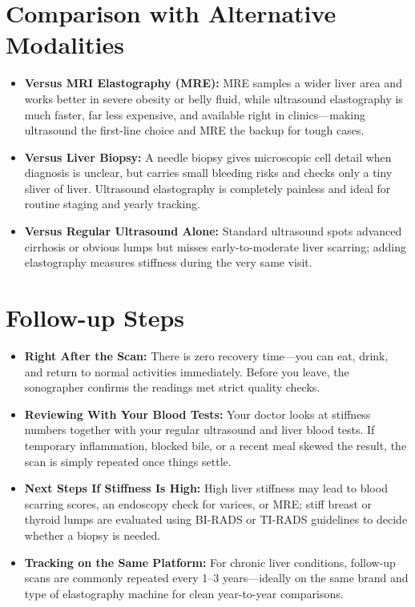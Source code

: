 \section{Comparison with Alternative Modalities}

\begin{itemize}
    \item \textbf{Versus MRI Elastography (MRE):} MRE samples a wider liver area and works better in severe obesity or belly fluid, while ultrasound elastography is much faster, far less expensive, and available right in clinics---making ultrasound the first-line choice and MRE the backup for tough cases.
    \item \textbf{Versus Liver Biopsy:} A needle biopsy gives microscopic cell detail when diagnosis is unclear, but carries small bleeding risks and checks only a tiny sliver of liver. Ultrasound elastography is completely painless and ideal for routine staging and yearly tracking.
    \item \textbf{Versus Regular Ultrasound Alone:} Standard ultrasound spots advanced cirrhosis or obvious lumps but misses early-to-moderate liver scarring; adding elastography measures stiffness during the very same visit.
\end{itemize}

\section{Follow-up Steps}

\begin{itemize}
    \item \textbf{Right After the Scan:} There is zero recovery time---you can eat, drink, and return to normal activities immediately. Before you leave, the sonographer confirms the readings met strict quality checks.
    \item \textbf{Reviewing With Your Blood Tests:} Your doctor looks at stiffness numbers together with your regular ultrasound and liver blood tests. If temporary inflammation, blocked bile, or a recent meal skewed the result, the scan is simply repeated once things settle.
    \item \textbf{Next Steps If Stiffness Is High:} High liver stiffness may lead to blood scarring scores, an endoscopy check for varices, or MRE; stiff breast or thyroid lumps are evaluated using BI-RADS or TI-RADS guidelines to decide whether a biopsy is needed.
    \item \textbf{Tracking on the Same Platform:} For chronic liver conditions, follow-up scans are commonly repeated every 1--3 years---ideally on the same brand and type of elastography machine for clean year-to-year comparisons.
\end{itemize}

